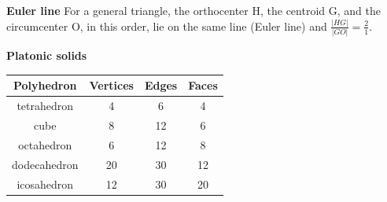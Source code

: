 \textbf{Euler line}
For a general triangle, the orthocenter H, the centroid G, 
and the circumcenter O, in this order, lie on the same line (Euler line) 
and $\frac{|HG|}{|GO|} = \frac{2}{1}$.



\textbf{Platonic solids}
\begin{tabular}{ |c|c|c|c| } 
\hline
Polyhedron & Vertices & Edges & Faces \\ 
\hline
tetrahedron & 4 & 6 & 4 \\ 
\hline
cube & 8 & 12 & 6 \\ 
\hline
octahedron & 6 & 12 & 8 \\
\hline
dodecahedron & 20 & 30 & 12 \\
\hline
icosahedron & 12 & 30 & 20 \\
\hline
\end{tabular}
 
